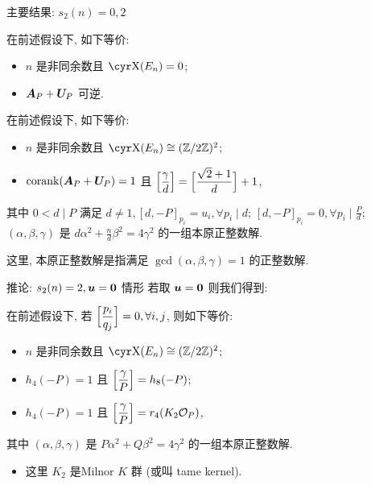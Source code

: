 \documentclass[aspectratio=169]{ctexbeamer}
\renewcommand\aleg[2]{\Bigl[\dfrac{{#1}}{#2}\Bigr]}
\begin{document}
\begin{frame}{主要结果: $s_2(n)=0,2$}
	\onslide<+->
	\begin{theorem}
		在前述假设下, 如下等价:
		\begin{itemize}[<*>]
			\item $n$ 是非同余数且 $\Sha(E_n)=0$;
			\item ${\boldsymbol{A}}_P+{\boldsymbol{U}}_P$ 可逆.
		\end{itemize}
	\end{theorem}
	\onslide<+->
	\begin{theorem}
		在前述假设下, 如下等价:
		\begin{itemize}[<*>]
			\item $n$ 是非同余数且 $\Sha(E_n)\cong(\BZ/2\BZ)^2$;
			\item $\operatorname{corank}({\boldsymbol{A}}_P+{\boldsymbol{U}}_P)=1$ 且 $\aleg{\gamma}d=\aleg{\sqrt2+1}{d}+1$,
		\end{itemize}
		其中 $0<d\mid P$ 满足 $d\ne 1, [d,-P]_{p_i}=u_i,\forall p_i\mid d$; $[d,-P]_{p_i}=0,\forall p_i\mid \frac Pd$;  $(\alpha,\beta,\gamma)$ 是 $d\alpha^2+\frac{n}d\beta^2=4\gamma^2$ 的一组本原正整数解.
	\end{theorem}
	\onslide<+->
	这里, 本原正整数解是指满足 $\gcd(\alpha,\beta,\gamma)=1$ 的正整数解.
\end{frame}


\begin{frame}{推论: $s_2(n)=2,{\boldsymbol{u}}={\bf0}$ 情形}
	\onslide<+->
	若取 ${\boldsymbol{u}}={\bf0}$ 则我们得到:
	\onslide<+->
	\begin{corollary}
		在前述假设下, 若 $\aleg{p_i}{q_j}=0, \forall i,j$, 则如下等价:
		\begin{itemize}[<*>]
			\item $n$ 是非同余数且 $\Sha(E_n)\cong(\BZ/2\BZ)^2$;
			\item $h_4(-P)=1$ 且 $\aleg{\gamma}P=h_8(-P)$;
			\item $h_4(-P)=1$ 且 $\aleg{\gamma}P=r_4(K_2\CO_P)$,
		\end{itemize}
		其中 $(\alpha,\beta,\gamma)$ 是 $P\alpha^2+Q\beta^2=4\gamma^2$ 的一组本原正整数解.
	\end{corollary}
	\begin{itemize}
		\item 这里 $K_2$ 是Milnor $K$ 群 (或叫 tame kernel).
	\end{itemize}
\end{frame}
\end{document}
